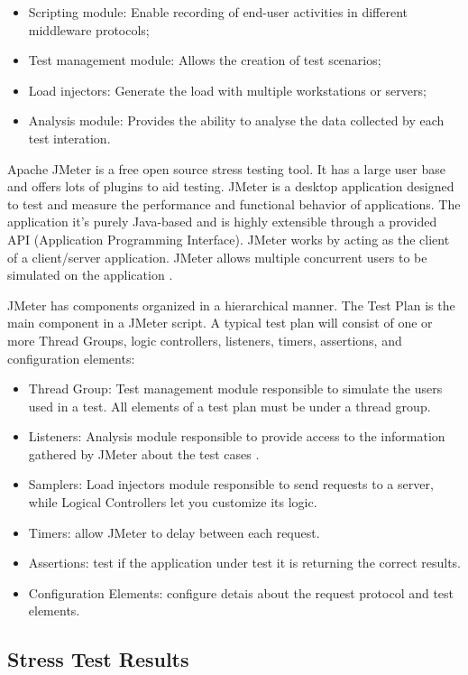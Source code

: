 \documentclass[times]{stvrauth}
\begin{document}
\begin{itemize}
\item Scripting module: Enable recording of end-user activities in different middleware protocols;
\item Test management module: Allows the creation of test scenarios;
\item Load injectors: Generate the load with multiple workstations or servers;
\item Analysis module: Provides the ability to analyse the data collected by each test interation.
\end{itemize}

Apache JMeter is a free open source stress testing tool.  It has a large user base and offers lots of plugins to aid testing. JMeter is a desktop application designed to test and measure the performance and functional behavior of applications. The application it's purely Java-based and is highly extensible through a provided API (Application Programming Interface). JMeter works by acting as the client of a client/server application. JMeter allows multiple concurrent users to be simulated on the application \cite{Halili2008} \cite{Erinle2013}. 

JMeter has components organized  in a hierarchical manner. The Test Plan is the main component in a JMeter script. A typical test plan will consist of one or more Thread Groups, logic controllers, listeners, timers, assertions, and configuration elements:

\begin{itemize}
\item Thread Group: Test management module responsible to simulate the users used in a test. All elements of a test plan must be under a thread group.
\item Listeners: Analysis module responsible to provide access to the information gathered by JMeter about the test cases .
\item Samplers: Load injectors module responsible to send requests to a server, while Logical Controllers let you customize its logic.
\item Timers: allow JMeter to delay between each request.
\item Assertions: test if the application under test it is returning the correct results.
\item Configuration Elements: configure detais about the request protocol and test elements.
\end{itemize}


\subsection{Stress Test Results}
\end{document}
